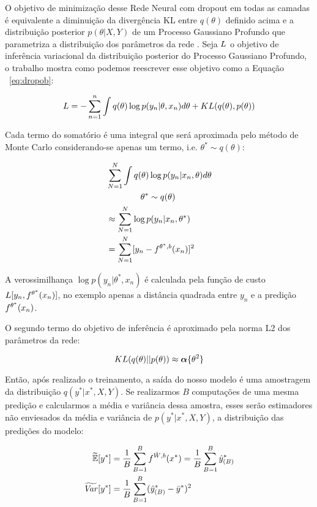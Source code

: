 O objetivo de minimização desse Rede Neural com dropout em todas as camadas é
equivalente a diminuição da divergência KL entre $q(\theta)$ definido acima e a distribuição
posterior $p(\theta | X,Y)$ de um Processo Gaussiano Profundo que parametriza a
distribuição dos parâmetros da rede \citep{dropbayes}. Seja $\mathnormal{L}$ o
objetivo de inferência variacional da distribuição posterior do Processo Gaussiano Profundo, o trabalho
\citep{dropbayes} mostra como podemos reescrever esse objetivo como a Equação ~\ref{eq:dropob}:

\[
    \mathnormal{L} = - \sum^n_{n=1}\int{q(\theta)  \log p(y_n | \theta,x_n)}d\theta + \mathnormal{KL}(q(\theta),p(\theta))
\]


Cada termo do somatório é uma integral que será aproximada pelo método de Monte Carlo 
considerando-se apenas um termo, i.e. $\theta^* \sim q(\theta)$:

\begin{align*}
                    &\sum^N_{N=1} \int q(\theta) \log p(y_n | x_n,\theta)d\theta \\ 
                    &\qquad \qquad  \theta^* \sim q(\theta) \\
                    &\approx \sum^N_{N=1} \log p(y_n | x_n,\theta^*) \\
                    &= \sum^N_{N=1} [y_n - \mathnormal{f}^{\theta^*,b}(x_n)]^2
\end{align*}

A verossimilhança $\log p(y_n | \theta^*,x_n)$ é calculada pela
função de custo $L[y_n,\mathnormal{f}^{\theta^*}(x_n)]$, no exemplo apenas a distância quadrada
entre $y_n$ e a predição $\mathnormal{f}^{\theta^*}(x_n)$.

O segundo termo do objetivo de inferência é aproximado pela norma L2 dos
parâmetros da rede:

\begin{equation}
    \mathnormal{KL}(q(\theta) ||p(\theta)) \approx \boldsymbol{\alpha}\{\theta^2\}
 \end{equation} 

Então, após realizado o treinamento, a saída do nosso modelo é uma amostragem da
distribuição $q(y^* | x^*,X,Y)$. Se realizarmos $B$ computações de uma mesma
predição e calcularmos a média e variância dessa amostra, esses serão
estimadores não enviesados da média e variância de $p(y^*|x^*,X,Y)$, a
distribuição das predições do modelo:


\begin{align*}
  \label{eq:aproxs}
  \widetilde{\mathbb{E}}[y^*] &=
   \frac{1}{B}\sum^B_{B=1}\mathnormal{f}^{\hat{W},b}(x^*) = \frac{1}{B}\sum^B_{B=1}\hat{y}^*_{(B)}\\ 
   \widetilde{\mathit{Var}}[y^*]  &= \frac{1}{B}\sum^B_{B=1}(\hat{y}^*_{(B)} - \bar{y}^*)^2 
 \end{align*}



